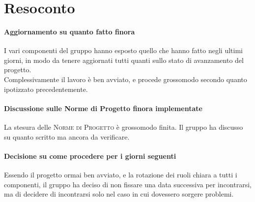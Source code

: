 \documentclass{article}
\begin{document}
\section{Resoconto}%
\label{resoconto}
\paragraph*{Aggiornamento su quanto fatto finora}
I vari componenti del gruppo hanno esposto quello che hanno fatto negli ultimi giorni, in modo da tenere aggiornati tutti quanti sullo stato di avanzamento del progetto. \\
Complessivamente il lavoro è ben avviato, e procede grossomodo secondo quanto ipotizzato precedentemente.

\paragraph*{Discussione sulle Norme di Progetto finora implementate}
La stesura delle \textsc{Norme di Progetto} è grossomodo finita. Il gruppo ha discusso su quanto scritto ma ancora da verificare.

\paragraph*{Decisione su come procedere per i giorni seguenti}
Essendo il progetto ormai ben avviato, e la rotazione dei ruoli chiara a tutti i componenti, il gruppo ha deciso di non fissare una data successiva per incontrarsi, ma di decidere di incontrarsi solo nel caso in cui dovessero sorgere problemi. 
\end{document}
